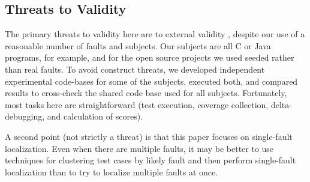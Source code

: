 \subsection{Threats to Validity}

The primary threats to validity here are to external validity
\cite{Threats}, despite our use of a reasonable number of faults and subjects.  Our subjects are all C or
Java programs, for example, and for the open source projects we used
seeded rather than real faults.  To avoid
construct threats, we developed independent experimental code-bases
for some of the subjects, executed both, and compared results to
cross-check the shared code base used for all subjects.  Fortunately,
most tasks here are straightforward (test execution, coverage
collection, delta-debugging, and calculation of scores).

A second point (not strictly a threat) is that this paper focuses on
single-fault localization.    Even when
there are multiple faults, it may be better to use techniques for
clustering test cases by likely fault 
\cite{Jones07,PLDI13,Podgurski04} and then perform
single-fault localization than to try to localize multiple faults at
once.

